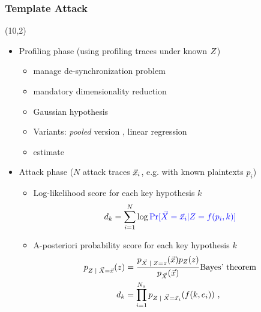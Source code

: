 \begin{frame}
\frametitle{Template Attack}
 \begin{textblock}{5}(10,2)
 \end{textblock}
\begin{itemize}
\item Profiling phase (using profiling traces under known $Z$)
\begin{itemize}
\item manage de-synchronization problem
\item mandatory dimensionality reduction
\item Gaussian hypothesis \cite{Chari2003}
\item Variants: \emph{pooled} version \cite{choudary2014efficient}, linear regression \cite{schindler2005stochastic}
\item estimate  
\end{itemize}
\item Attack phase ($N$ attack traces $\vec{x}_i$, e.g. with known plaintexts $p_i$)

\begin{itemize}
\item Log-likelihood score for each key hypothesis $k$
\begin{equation*}
d_k = \sum_{i=1}^{N}\log \textcolor{blue}{\mathrm{Pr}[\vec{X}=\vec{x}_i | Z=f(p_i,k)]}
\end{equation*}


\item A-posteriori probability score for each key hypothesis $k$
\begin{align*}
\pdf_{\given{\sensRandVar}{  \vaLeakVec = \vLeakVec}}(\sensVar) &= \frac{\pdf_{\given{\vaLeakVec}{\sensRandVar = \sensVar}}(\vLeakVec)\pdf_{\sensRandVar}(\sensVar)} {\pdf_{\vaLeakVec}(\vLeakVec)} \text{Bayes' theorem}\\
d_{\keyVar} &= \prod_{i=1}^{\nbAttackTraces} \pdf_{\given{\sensRandVar}{\vaLeakVec = \vLeakVec_i}}(\sensFunction(\keyVar,\publicParVar_i) ) \mbox{ ,}
\end{align*}
\end{itemize}

\end{itemize}
\end{frame}



